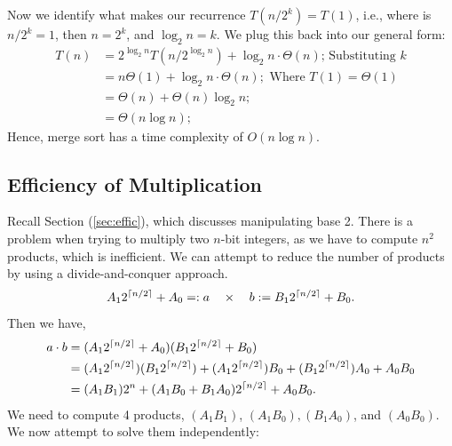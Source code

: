 \begin{Proof}
\vspace{-1.5em}
\noindent
Now we identify what makes our recurrence $T(n/2^k) = T(1)$, i.e., where is $n/2^k = 1$, then $n=2^k$, and $\log_2 n = k$. We plug this back into our general form:
\begin{align*}
    T(n) &= 2^{\log_2 n}T(n/2^{\log_2 n}) + \log_2 n\cdot \Theta(n)\text{; Substituting $k$}\\
    &= n\Theta(1) + \log_2 n\cdot\Theta(n);\text{ Where $T(1)=\Theta(1)$}\\
    &= \Theta(n) + \Theta(n)\log_2 n;\\
    &= \Theta(n\log n);
\end{align*}
Hence, merge sort has a time complexity of $O(n\log n)$.
\end{Proof}

\newpage 

\noindent

\subsection{Efficiency of Multiplication}
Recall Section (\ref{sec:effic}), which discusses manipulating base 2. There is a problem when trying to 
multiply two $n$-bit integers, as we have to compute $n^2$ products, which is inefficient. We can attempt to reduce the number of products by using a divide-and-conquer approach.\\
\[A_1 2^{\lceil n/2\rceil}+A_0=:a \quad \times \quad b:= B_1 2^{\lceil n/2\rceil}+B_0.\]
\noindent
Then we have,
\begin{align*}
    a\cdot b &=(A_1 2^{\lceil n/2\rceil}+A_0)(B_1 2^{\lceil n/2\rceil}+B_0)\\
    &=(A_1 2^{\lceil n/2\rceil})(B_1 2^{\lceil n/2\rceil})+(A_1 2^{\lceil n/2\rceil})B_0+(B_1 2^{\lceil n/2\rceil})A_0+A_0B_0\\
    &=(A_1B_1)2^{n}+(A_1B_0+B_1A_0)2^{\lceil n/2\rceil}+A_0B_0.
\end{align*}
\noindent
We need to compute 4 products, $(A_1B_1)$, $(A_1B_0), (B_1A_0)$, and $(A_0B_0)$. We now attempt to solve them independently:

